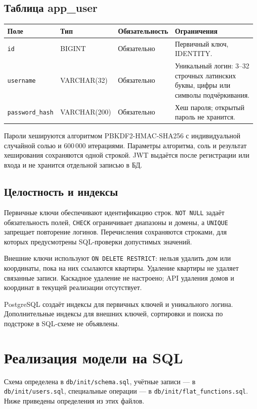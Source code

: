 \documentclass[12pt,a4paper]{article}
\begin{document}
\subsection{Таблица app\_user}
\begin{tabularx}{\linewidth}{|p{3.2cm}|p{2.4cm}|p{2.6cm}|X|}
\hline
\textbf{Поле} & \textbf{Тип} & \textbf{Обязательность} & \textbf{Ограничения} \\ \hline
\texttt{id} & BIGINT & Обязательно & Первичный ключ, IDENTITY. \\ \hline
\texttt{username} & VARCHAR(32) & Обязательно & Уникальный логин: 3--32 строчных латинских буквы, цифры или символы подчёркивания. \\ \hline
\texttt{password\_hash} & VARCHAR(200) & Обязательно & Хеш пароля; открытый пароль не хранится. \\ \hline
\end{tabularx}

Пароли хешируются алгоритмом PBKDF2-HMAC-SHA256 с индивидуальной случайной
солью и 600\,000 итерациями. Параметры алгоритма, соль и результат хеширования
сохраняются одной строкой. JWT выдаётся после регистрации или входа и не
хранится отдельной записью в БД.

\subsection{Целостность и индексы}

Первичные ключи обеспечивают идентификацию строк. \texttt{NOT NULL} задаёт
обязательность полей, \texttt{CHECK} ограничивает диапазоны и домены, а
\texttt{UNIQUE} запрещает повторение логинов. Перечисления сохраняются
строками, для которых предусмотрены SQL-проверки допустимых значений.

Внешние ключи используют \texttt{ON DELETE RESTRICT}: нельзя удалить дом
или координаты, пока на них ссылаются квартиры. Удаление квартиры не удаляет
связанные записи. Каскадное удаление не настроено; API удаления домов и
координат в текущей реализации отсутствует.

PostgreSQL создаёт индексы для первичных ключей и уникального логина.
Дополнительные индексы для внешних ключей, сортировки и поиска по подстроке
в SQL-схеме не объявлены.

\section{Реализация модели на SQL}

Схема определена в \texttt{db/init/schema.sql}, учётные записи --- в
\texttt{db/init/users.sql}, специальные операции --- в
\texttt{db/init/flat\_functions.sql}. Ниже приведены определения из этих файлов.
\end{document}
